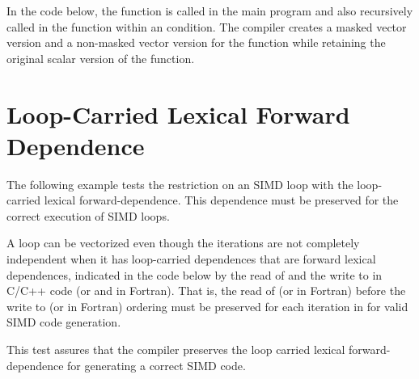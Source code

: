 

In the code below, the function  is called in the main program and 
also recursively called in the function  within an  
condition. The compiler creates a masked vector version and a non-masked vector 
version for the function  while retaining the original scalar 
version of the  function.





\section{Loop-Carried Lexical Forward Dependence}
\label{sec:SIMD_forward_dep}


 The following example tests the restriction on an SIMD loop with the loop-carried lexical forward-dependence. This dependence must be preserved for the correct execution of SIMD loops.

A loop can be vectorized even though the iterations are not completely independent when it has loop-carried dependences that are forward lexical dependences, indicated in the code below by the read of  and the write to  in C/C++ code (or  and  in Fortran). That is, the read of  (or  in Fortran) before the write to  (or  in Fortran) ordering must be preserved for each iteration in  for valid SIMD code generation.

This test assures that the compiler preserves the loop carried lexical forward-dependence for generating a correct SIMD code.



